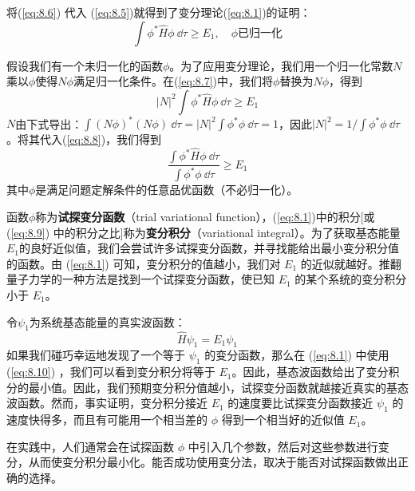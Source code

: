     将(\ref{eq:8.6}) 代入 (\ref{eq:8.5})就得到了变分理论(\ref{eq:8.1})的证明：
    \begin{equation}
        \int \phi^{\ast} \hat{H}\phi \:\dd \tau \geq E_1, \quad \phi \text{已归一化}
        \label{eq:8.7}
    \end{equation}

    假设我们有一个未归一化的函数$\phi$。为了应用变分理论，我们用一个归一化常数$N$乘以$\phi$使得$N\phi$满足归一化条件。在(\ref{eq:8.7})中，我们将$\phi$替换为$N\phi$，得到
    \begin{equation}
        \left|N\right|^2 \int \phi^{\ast} \hat{H}\phi \:\dd \tau \geq E_1
        \label{eq:8.8}
    \end{equation}
    $N$由下式导出：$\int \left(N\phi\right)^{\ast} \left(N\phi\right) \:\dd \tau = \left|N\right|^2 \int \phi^{\ast} \phi \:\dd \tau = 1$，因此$\left|N\right|^2 = 1/\int \phi^{\ast} \phi \:\dd \tau$。将其代入(\ref{eq:8.8})，我们得到
    \begin{equation}
        \boxed{
            \frac{\int \phi^{\ast} \hat{H}\phi \:\dd \tau}{\int \phi^{\ast} \phi \:\dd \tau} \geq E_1
        }
        \label{eq:8.9}
    \end{equation}
    其中$\phi$是满足问题定解条件的任意品优函数（不必归一化）。

    函数$\phi$称为\textbf{试探变分函数}（trial variational function），(\ref{eq:8.1})中的积分[或 (\ref{eq:8.9}) 中的积分之比]称为\textbf{变分积分}（variational integral）。为了获取基态能量$E_1$的良好近似值，我们会尝试许多试探变分函数，并寻找能给出最小变分积分值的函数。由 (\ref{eq:8.1}) 可知，变分积分的值越小，我们对 $E_1$ 的近似就越好。推翻量子力学的一种方法是找到一个试探变分函数，使已知 $E_1$ 的某个系统的变分积分小于 $E_1$。

    令$\psi_1$为系统基态能量的真实波函数：
    \begin{equation}
        \hat{H}\psi_1 = E_1 \psi_1
        \label{eq:8.10}
    \end{equation}
    如果我们碰巧幸运地发现了一个等于 $\psi_1$ 的变分函数，那么在 (\ref{eq:8.1}) 中使用 (\ref{eq:8.10}) ，我们可以看到变分积分将等于 $E_1$。因此，基态波函数给出了变分积分的最小值。因此，我们预期变分积分值越小，试探变分函数就越接近真实的基态波函数。然而，事实证明，变分积分接近 $E_1$ 的速度要比试探变分函数接近 $\psi_1$ 的速度快得多，而且有可能用一个相当差的 $\phi$ 得到一个相当好的近似值 $E_1$。

    在实践中，人们通常会在试探函数 $\phi$ 中引入几个参数，然后对这些参数进行变分，从而使变分积分最小化。能否成功使用变分法，取决于能否对试探函数做出正确的选择。

